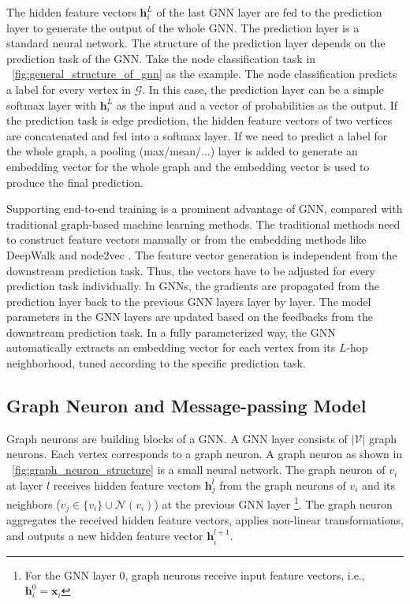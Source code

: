 The hidden feature vectors $\boldsymbol{h}^L_i$ of the last GNN layer are fed to the prediction layer to generate the output of the whole GNN.
The prediction layer is a standard neural network.
The structure of the prediction layer depends on the prediction task of the GNN.
Take the node classification task in \figurename~\ref{fig:general_structure_of_gnn} as the example.
The node classification predicts a label for every vertex in $\mathcal{G}$.
In this case, the prediction layer can be a simple softmax layer with $\boldsymbol{h}^L_i$ as the input and a vector of probabilities as the output.
If the prediction task is edge prediction, the hidden feature vectors of two vertices are concatenated and fed into a softmax layer.
If we need to predict a label for the whole graph, a pooling (max/mean/...) layer is added to generate an embedding vector for the whole graph and the embedding vector is used to produce the final prediction.

Supporting end-to-end training is a prominent advantage of GNN, compared with traditional graph-based machine learning methods.
The traditional methods need to construct feature vectors manually or from the embedding methods like DeepWalk \cite{bryan2014_deepwalk} and node2vec \cite{aditya2016_node2vec}.
The feature vector generation is independent from the downstream prediction task. 
Thus, the vectors have to be adjusted for every prediction task individually.
In GNNs, the gradients are propagated from the prediction layer back to the previous GNN layers layer by layer. 
The model parameters in the GNN layers are updated based on the feedbacks from the downstream prediction task. 
In a fully parameterized way, the GNN automatically extracts an embedding vector for each vertex from its $L$-hop neighborhood, tuned according to the specific prediction task.

\subsection{Graph Neuron and Message-passing Model}

Graph neurons are building blocks of a GNN.
A GNN layer consists of $|\mathcal{V}|$ graph neurons.
Each vertex corresponds to a graph neuron.
A graph neuron as shown in \figurename~\ref{fig:graph_neuron_structure} is a small neural network.
The graph neuron of $v_i$ at layer $l$ receives hidden feature vectors $\boldsymbol{h}^l_j$ from the graph neurons of $v_i$ and its neighbors ($v_j \in \{v_i\} \cup \mathcal{N}(v_i)$) at the previous GNN layer \footnote{For the GNN layer 0, graph neurons receive input feature vectors, i.e., $\boldsymbol{h}^0_i=\boldsymbol{x}_i$}.
The graph neuron aggregates the received hidden feature vectors, applies non-linear transformations, and outputs a new hidden feature vector $\boldsymbol{h}_i^{l+1}$.

